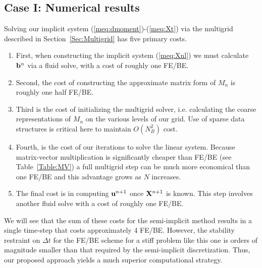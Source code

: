 \subsection{Case I: Numerical results}
Solving our implicit system (\ref{meq:dmoment})-(\ref{meq:Xt}) via the multigrid described in Section~\ref{Sec:Multigrid} has five primary costs.
\begin{enumerate}
\item First, when constructing the implicit system (\ref{meq:Xnl}) we must calculate $\mathbf{b}^n$ via a fluid solve, with a cost of roughly one FE/BE.
\item Second, the cost of constructing the approximate matrix form of $M_n$ is roughly one half FE/BE.
\item Third is the cost of initializing the multigrid solver, i.e. calculating the coarse representations of $M_n$ on the various levels of our grid. Use of sparse data structures is critical here to maintain $O(N_B^2)$ cost.
\item Fourth, is the cost of our iterations to solve the linear system. Because matrix-vector multiplication is significantly cheaper than FE/BE (see Table~\ref{Table:MV}) a full multigrid step can be much more economical than one FE/BE and this advantage grows  as $N$ increases.
\item The final cost is in computing $\mathbf{u}^{n+1}$ once $\mathbf{X}^{n+1}$ is known. This step involves another fluid solve with a cost of roughly one FE/BE.
\end{enumerate}    
We will see that the sum of these costs for the semi-implicit method results in a single time-step that costs approximately 4 FE/BE. However, the stability restraint on $\Delta t$ for the FE/BE scheme for a stiff problem like this one is orders of magnitude smaller than that required by the semi-implicit discretization. Thus, our proposed approach yields a much superior computational strategy.


